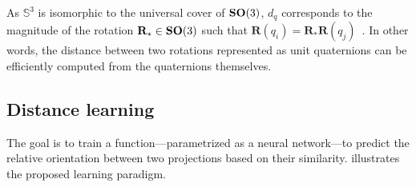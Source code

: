 As $\mathbb{S}^3$ is isomorphic to the universal cover of $\mathrm{\mathbf{SO}}(3)$, $d_q$ corresponds to the magnitude of the rotation $\mathbf{R}_* \in \mathrm{\mathbf{SO}}(3)$ such that $\mathbf{R}(q_i) = \mathbf{R}_* \mathbf{R}(q_j)$~\cite{huynh2009metrics}.
In other words, the distance between two rotations represented as unit quaternions can be efficiently computed from the quaternions themselves.



\subsection{Distance learning}\label{sec:method:distance-learning}



The goal is to train a function---parametrized as a neural network---to predict the relative orientation between two projections based on their similarity.  illustrates the proposed learning paradigm.

